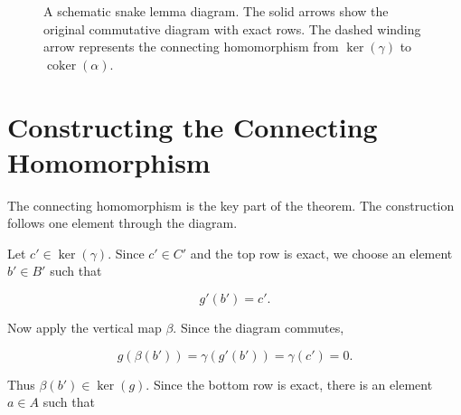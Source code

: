 \begin{figure}[htbp]
\caption[A schematic snake lemma diagram]{A schematic snake lemma diagram. The solid arrows show the original commutative diagram with exact rows. The dashed winding arrow represents the connecting homomorphism from \(\ker(\gamma)\) to \(\operatorname{coker}(\alpha)\).}
\label{fig:snake-lemma-diagram}
\end{figure}

\section{Constructing the Connecting Homomorphism}
\label{sec:connecting-homomorphism}

The connecting homomorphism is the key part of the theorem. The construction follows one element through the diagram.

Let \(c'\in \ker(\gamma)\). Since \(c'\in C'\) and the top row is exact, we choose an element \(b'\in B'\) such that

\begin{equation}
g'(b')=c'.
\label{eq:choose-b-prime}
\end{equation}

Now apply the vertical map \(\beta\). Since the diagram commutes,

\begin{equation}
g(\beta(b'))=\gamma(g'(b'))=\gamma(c')=0.
\label{eq:commuting-step}
\end{equation}

Thus \(\beta(b')\in \ker(g)\). Since the bottom row is exact, there is an element \(a\in A\) such that

